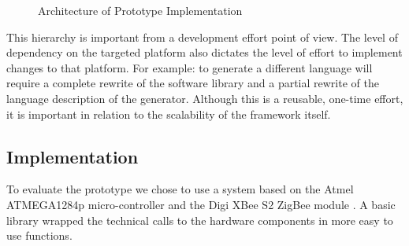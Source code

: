 \documentclass[conference]{IEEEtran}
\begin{document}
\begin{figure}[ht]
  \centering
  \caption{Architecture of Prototype Implementation}
  \label{fig:architecture}
\end{figure}

This hierarchy is important from a development effort point of view. The level
of dependency on the targeted platform also dictates the level of effort to
implement changes to that platform. For example: to generate a different
language will require a complete rewrite of the software library and a partial
rewrite of the language description of the generator. Although this is a
reusable, one-time effort, it is important in relation to the scalability of
the framework itself.

\subsection{Implementation}

To evaluate the prototype we chose to use a system based on the Atmel
ATMEGA1284p micro-controller \cite{datasheet:atmega1284p} and the Digi XBee S2
ZigBee module \cite{manual:xbee}. A basic library wrapped the technical calls
to the hardware components in more easy to use functions.
\end{document}

